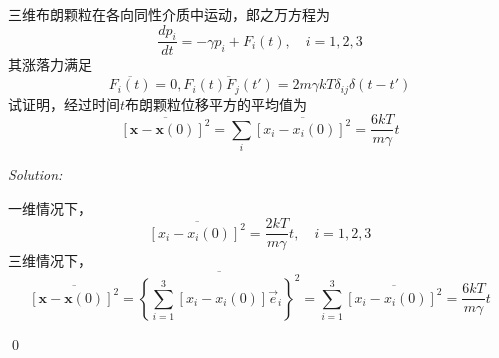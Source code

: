 \documentclass[12pt,a4paper]{article}
\newenvironment{problem}[2][Problem]{\begin{trivlist}
\item[\hskip \labelsep {\bfseries #1}\hskip \labelsep {\bfseries #2.}]}{\end{trivlist}}
\newenvironment{sol}
    {\emph{Solution:}
    }
    {
    \qed
    }
\begin{document}
\begin{problem}{10.8}
三维布朗颗粒在各向同性介质中运动，郎之万方程为
\[
\frac{dp_i}{dt}=-\gamma p_i+F_i(t),\quad i=1,2,3
\]
其涨落力满足
\[
\overline{F_i(t)}=0,\overline{F_i(t)F_j(t')}=2m\gamma kT\delta_{ij}\delta(t-t')
\]
试证明，经过时间$t$布朗颗粒位移平方的平均值为
\[
\overline{[\bm{x}-\bm{x}(0)]^2}=\sum_i\overline{[x_i-x_i(0)]^2}=\frac{6kT}{m\gamma}t
\]
\end{problem}
\begin{sol}
一维情况下，
\begin{equation}
\overline{[x_i-x_i(0)]^2}=\frac{2kT}{m\gamma}t,\quad i=1,2,3
\end{equation}
三维情况下，
\begin{equation}
\overline{[\bm{x}-\bm{x}(0)]^2}=\overline{\left\{\sum_{i=1}^3[x_i-x_i(0)]\vec{e}_i\right\}^2}=\sum_{i=1}^3\overline{[x_i-x_i(0)]^2}=\frac{6kT}{m\gamma}t
\end{equation}
\end{sol}
\end{document}
